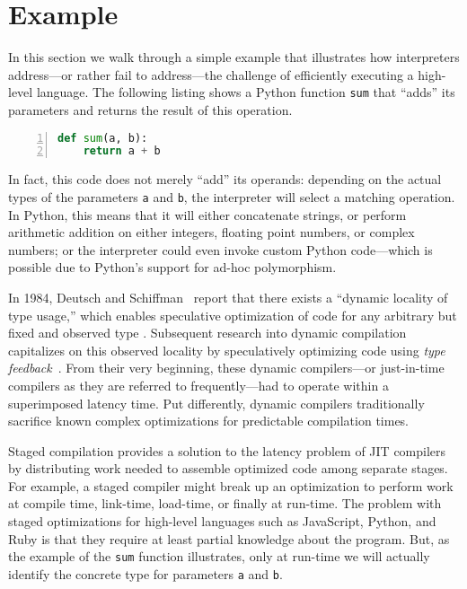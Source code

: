 \documentclass[preprint,10pt]{popl14conf}
\begin{document}
\section{Example}\label{s:example}

In this section we walk through a simple example that illustrates how interpreters address---or
rather fail to address---the challenge of efficiently executing a high-level language.
The following listing shows a Python function \texttt{sum} that ``adds'' its parameters and returns
the result of this operation.
\begin{lstlisting}[language=Python,morekeywords={JUMPTO,DISPATCH,r13},numbers=left,numberstyle=\tiny,style=othercode]
def sum(a, b):
    return a + b
\end{lstlisting}

In fact, this code does not merely ``add'' its operands: depending on the actual types of the
parameters \texttt{a} and \texttt{b}, the interpreter will select a matching operation.
In Python, this means that it will either concatenate strings, or perform arithmetic addition on
either integers, floating point numbers, or complex numbers; or the interpreter could even invoke
custom Python code---which is possible due to Python's support for ad-hoc polymorphism.

In 1984, Deutsch and Schiffman~\cite{deutsch.schiffman+84} report that there exists a ``dynamic
locality of type usage,'' which enables speculative optimization of code for any arbitrary but fixed
and observed type .
Subsequent research into dynamic compilation capitalizes on this observed locality by speculatively
optimizing code using \emph{type feedback}~\cite{holzle.ungar+94,holzle+94}.
From their very beginning, these dynamic compilers---or just-in-time compilers as they are referred
to frequently---had to operate within a superimposed latency time.
Put differently, dynamic compilers traditionally sacrifice known complex optimizations for
predictable compilation times.

Staged compilation provides a solution to the latency problem of JIT compilers by distributing work
needed to assemble optimized code among separate stages.
For example, a staged compiler might break up an optimization to perform work at compile time,
link-time, load-time, or finally at run-time.
The problem with staged optimizations for high-level languages such as JavaScript, Python, and Ruby
is that they require at least partial knowledge about the program.
But, as the example of the \texttt{sum} function illustrates, only at run-time we will actually
identify the concrete type  for parameters \texttt{a} and \texttt{b}.
\end{document}
